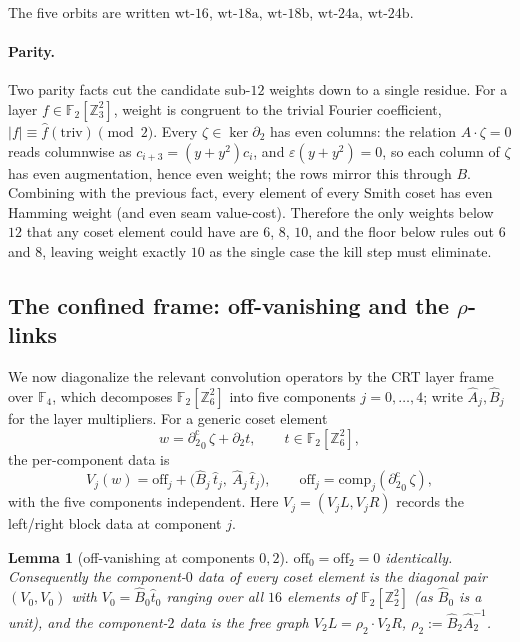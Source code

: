 \documentclass[11pt]{article}
\newcommand{\Z}{\mathbb{Z}}
\newcommand{\F}[1]{\mathbb{F}_{#1}}
\newcommand{\wt}[1]{\lvert #1\rvert}
\newcommand{\aug}{\varepsilon}
\newcommand{\hA}{\hat{A}}
\newcommand{\hB}{\hat{B}}
\newcommand{\dcut}{\partial_2^{\mathrm{c}}}     %
\theoremstyle{plain}
\newtheorem{lemma}{Lemma}[section]
\theoremstyle{definition}
\theoremstyle{remark}
\begin{document}
\noindent The five orbits are written $\mathrm{wt}\text{-}16$,
$\mathrm{wt}\text{-}18\mathrm a$, $\mathrm{wt}\text{-}18\mathrm b$,
$\mathrm{wt}\text{-}24\mathrm a$, $\mathrm{wt}\text{-}24\mathrm b$.

\paragraph{Parity.}
Two parity facts cut the candidate sub-$12$ weights down to a single residue. For
a layer $f\in\F2[\Z_3^2]$, weight is congruent to the trivial Fourier coefficient,
$\wt f\equiv\hat f(\mathrm{triv})\pmod 2$. Every $\zeta\in\ker\partial_2$ has even
columns: the relation $A\cdot\zeta=0$ reads columnwise as
$c_{i+3}=(y+y^2)c_i$, and $\aug(y+y^2)=0$, so each column of $\zeta$ has even
augmentation, hence even weight; the rows mirror this through $B$. Combining with
the previous fact, every element of every Smith coset has even Hamming weight (and
even seam value-cost). Therefore the only weights below $12$ that any coset element
could have are $6$, $8$, $10$, and the floor below rules out $6$ and $8$, leaving
weight exactly $10$ as the single case the kill step must eliminate.

\subsection{The confined frame: off-vanishing and the \texorpdfstring{$\rho$}{rho}-links}\label{ssec:offvanish}

We now diagonalize the relevant convolution operators by the CRT layer frame over
$\F4$, which decomposes $\F2[\Z_6^2]$ into five components $j=0,\dots,4$; write
$\hA_j,\hB_j$ for the layer multipliers. For a generic coset element
\[
  w={\dcut}_0\,\zeta+\partial_2 t,\qquad t\in\F2[\Z_6^2],
\]
the per-component data is
\[
  V_j(w)=\mathrm{off}_j+\bigl(\hB_j\,\hat t_j,\ \hA_j\,\hat t_j\bigr),
  \qquad \mathrm{off}_j=\mathrm{comp}_j({\dcut}_0\,\zeta),
\]
with the five components independent. Here $V_j=(V_jL,V_jR)$ records the left/right
block data at component $j$.

\begin{lemma}[off-vanishing at components $0,2$]\label{lem:offvanish-statement}
$\mathrm{off}_0=\mathrm{off}_2=0$ identically. Consequently the component-$0$ data of
every coset element is the diagonal pair $(V_0,V_0)$ with $V_0=\hB_0\hat t_0$ ranging
over all $16$ elements of $\F2[\Z_2^2]$ (as $\hB_0$ is a unit), and the component-$2$
data is the free graph $V_2L=\rho_2\cdot V_2R$, $\rho_2:=\hB_2\hA_2^{-1}$.
\end{lemma}
\end{document}
